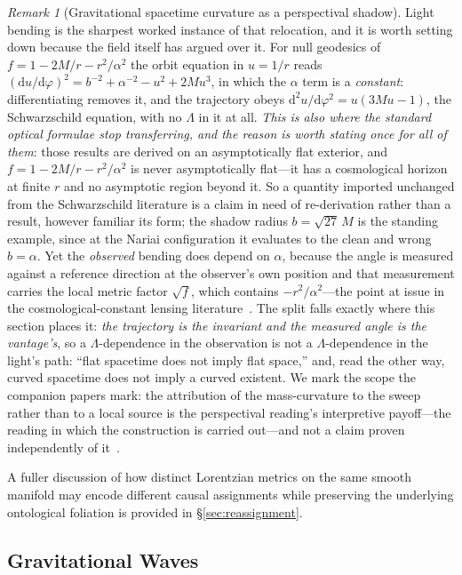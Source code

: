 \documentclass[11pt,a4paper]{article}
\theoremstyle{plain}
\theoremstyle{definition}
\theoremstyle{remark}
\newtheorem{remark}{Remark}
\newcommand{\dd}{\mathrm{d}}
\begin{document}
\begin{remark}[Gravitational spacetime curvature as a perspectival shadow]
Light bending is the sharpest worked instance of that relocation, and it is worth setting down because the field itself has argued over it. For null geodesics of $f=1-2M/r-r^{2}/\alpha^{2}$ the orbit equation in $u=1/r$ reads $(\dd u/\dd\varphi)^{2}=b^{-2}+\alpha^{-2}-u^{2}+2Mu^{3}$, in which the $\alpha$ term is a \emph{constant}: differentiating removes it, and the trajectory obeys $\dd^{2}u/\dd\varphi^{2}=u(3Mu-1)$, the Schwarzschild equation, with no $\Lambda$ in it at all. \emph{This is also where the standard optical formulae stop transferring, and the reason is worth stating once for all of them}: those results are derived on an asymptotically flat exterior, and $f=1-2M/r-r^{2}/\alpha^{2}$ is never asymptotically flat---it has a cosmological horizon at finite $r$ and no asymptotic region beyond it. So a quantity imported unchanged from the Schwarzschild literature is a claim in need of re-derivation rather than a result, however familiar its form; the shadow radius $b=\sqrt{27}\,M$ is the standing example, since at the Nariai configuration it evaluates to the clean and wrong $b=\alpha$. Yet the \emph{observed} bending does depend on $\alpha$, because the angle is measured against a reference direction at the observer's own position and that measurement carries the local metric factor $\sqrt{f}$, which contains $-r^{2}/\alpha^{2}$---the point at issue in the cosmological-constant lensing literature~\cite{RindlerIshak2007}. The split falls exactly where this section places it: \emph{the trajectory is the invariant and the measured angle is the vantage's}, so a $\Lambda$-dependence in the observation is not a $\Lambda$-dependence in the light's path: ``flat spacetime does not imply flat space,'' and, read the other way, curved spacetime does not imply a curved existent. We mark the scope the companion papers mark: the attribution of the mass-curvature to the sweep rather than to a local source is the perspectival reading's interpretive payoff---the reading in which the construction is carried out---and not a claim proven independently of it~\cite{JanzenGroupoid,JanzenShadowExistence}.
\end{remark}

A fuller discussion of how distinct Lorentzian metrics on the same smooth manifold may encode different causal assignments while preserving the underlying ontological foliation is provided in \S\ref{sec:reassignment}.

\subsection{Gravitational Waves}\label{sec:CR-gw}
\end{document}

